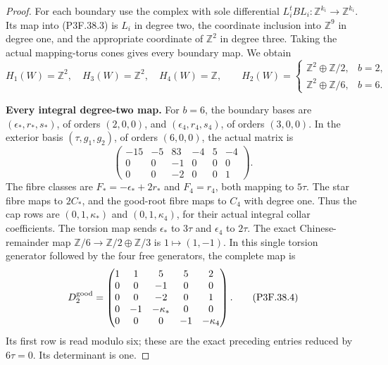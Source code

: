 \begin{proof}
For each boundary use the complex with sole differential
\(L_i^tBL_i:\mathbb Z^{k_i}\to\mathbb Z^{k_i}\).
Its map into (P3F.38.3) is \(L_i\) in degree two, the coordinate
inclusion into \(\mathbb Z^9\) in degree one, and the appropriate
coordinate of \(\mathbb Z^2\) in degree three. Taking the actual
mapping-torus cones gives every boundary map. We obtain
\[
 H_1(W)=\mathbb Z^2,\quad H_3(W)=\mathbb Z^2,\quad H_4(W)=\mathbb Z,
 \qquad
 H_2(W)=\begin{cases}\mathbb Z^2\oplus\mathbb Z/2,&b=2,\\
                         \mathbb Z^2\oplus\mathbb Z/6,&b=6.
          \end{cases}
\]

\par\medskip\noindent\textbf{Every integral degree-two map.}
For \(b=6\), the boundary bases are
\((\epsilon_*,r_*,s_*)\), of orders \((2,0,0)\), and
\((\epsilon_4,r_4,s_4)\), of orders \((3,0,0)\).
In the exterior basis \((\tau,g_1,g_2)\), of orders
\((6,0,0)\), the actual matrix is
\[
 \begin{pmatrix}
 -15&-5&83&-4&5&-4\\0&0&-1&0&0&0\\0&0&-2&0&0&1
 \end{pmatrix}.
\]
The fibre classes are \(F_*=-\epsilon_*+2r_*\) and
\(F_4=r_4\), both mapping to \(5\tau\). The star fibre
maps to \(2C_*\), and the good-root fibre maps to \(C_4\)
with degree one. Thus the cap rows are
\((0,1,\kappa_*)\) and \((0,1,\kappa_4)\), for their actual
integral collar coefficients. The torsion map sends
\(\epsilon_*\) to \(3\tau\) and \(\epsilon_4\) to
\(2\tau\). The exact Chinese-remainder map
\(\mathbb Z/6\to\mathbb Z/2\oplus\mathbb Z/3\) is
\(1\mapsto(1,-1)\). In this single torsion generator followed
by the four free generators, the complete map is
\[
 D_2^{\rm good}=\begin{pmatrix}
 1&1&5&5&2\\0&0&-1&0&0\\0&0&-2&0&1\\
 0&-1&-\kappa_*&0&0\\0&0&0&-1&-\kappa_4
 \end{pmatrix}.                                               \tag{P3F.38.4}
\]
Its first row is read modulo six; these are the exact preceding
entries reduced by \(6\tau=0\). Its determinant is one.


\end{proof}
